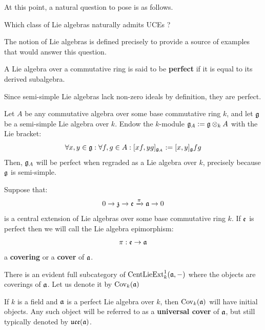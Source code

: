         At this point, a natural question to pose is as follows.
        \begin{question}
            Which class of Lie algebras naturally admits UCEs ? 
        \end{question}
        The notion of  Lie algebras is defined precisely to provide a source of examples that would answer this question.
        \begin{definition}
            A Lie algebra over a commutative ring is said to be \textbf{perfect} if it is equal to its derived subalgebra. 
        \end{definition}
        \begin{example}
            Since semi-simple Lie algebras lack non-zero ideals by definition, they are perfect. 
        \end{example}
        \begin{example}
            Let $A$ be any commutative algebra over some base commutative ring $k$, and let $\mathfrak{g}$ be a semi-simple Lie algebra over $k$. Endow the $k$-module $\g_A := \g \tensor_k A$ with the Lie bracket:
                $$\forall x, y \in \mathfrak{g}: \forall f, g \in A: [x f, y g]_{\mathfrak{g}_A} := [x, y]_{\mathfrak{g}} fg$$
            Then, $\mathfrak{g}_A$ will be perfect when regraded as a Lie algebra over $k$, precisely because $\mathfrak{g}$ is semi-simple.
        \end{example}
        \begin{definition}
            Suppose that:
                $$0 \to \mathfrak{z} \to \mathfrak{e} \xrightarrow[]{\pi} \mathfrak{a} \to 0$$
            is a central extension of Lie algebras over some base commutative ring $k$. If $\mathfrak{e}$ is perfect then we will call the Lie algebra epimorphism:
                $$\pi: \mathfrak{e} \to \mathfrak{a}$$
            a \textbf{covering} or a \textbf{cover} of $\mathfrak{a}$. 

            There is an evident full subcategory of $\mathrm{Cent}\mathrm{Lie}\mathrm{Ext}^1_k(\mathfrak{a}, -)$ where the objects are coverings of $\mathfrak{a}$. Let us denote it by $\mathrm{Cov}_k(\mathfrak{a})$
        \end{definition}
        \begin{proposition}
            \cite[Lemma 1.10]{garland_arithmetics_of_loop_groups} If $k$ is a field and $\mathfrak{a}$ is a perfect Lie algebra over $k$, then $\mathrm{Cov}_k(\mathfrak{a})$ will have initial objects. Any such object will be referred to as a \textbf{universal cover} of $\mathfrak{a}$, but still typically denoted by $\mathfrak{uce}(\mathfrak{a})$.
        \end{proposition}
